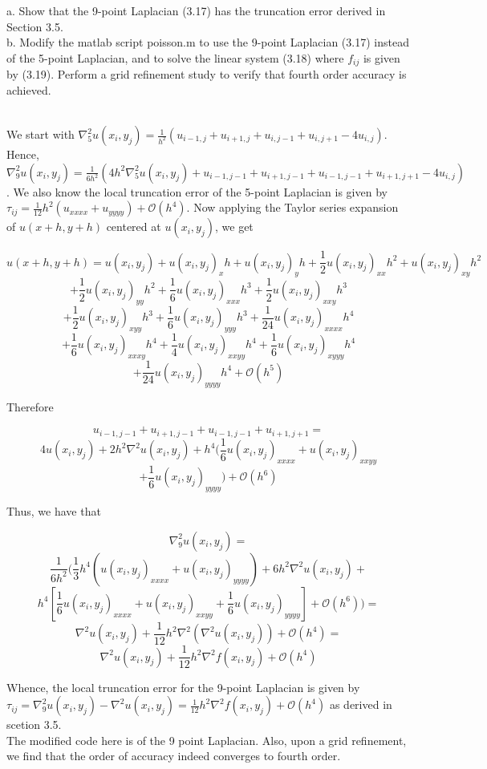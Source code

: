 a. Show that the 9-point Laplacian (3.17) has the truncation error derived in Section 3.5.\\
b. Modify the matlab script poisson.m to use the 9-point Laplacian (3.17) instead of the 5-point
Laplacian, and to solve the linear system (3.18) where $f_{ij}$ is given by (3.19). Perform a grid
refinement study to verify that fourth order accuracy is achieved.\\

\begin{solution}\renewcommand{\qedsymbol}{}\ \\
    We start with
    $\nabla_5^2u(x_i,y_j)=\frac{1}{h^2}(u_{i-1,j}+u_{i+1,j}+u_{i,j-1}+u_{i,j+1}-4u_{i,j})$.
    Hence, $\nabla_9^2u(x_i,y_j)=
    \frac{1}{6h^2}(4h^2\nabla_5^2u(x_i,y_j)+u_{i-1,j-1}+u_{i+1,j-1}+u_{i-1,j-1}+u_{i+1,j+1}-4u_{i,j})$.
    We also know the local truncation error of the 5-point Laplacian is given by
    $\tau_{ij}=\frac{1}{12}h^2(u_{xxxx}+u_{yyyy})+\mathcal{O}(h^4)$. Now applying the Taylor series
    expansion of $u(x+h,y+h)$ centered at $u(x_i,y_j)$, we get

    $$u(x+h,y+h)=u(x_i,y_j)+u(x_i,y_j)_xh+u(x_i,y_j)_yh+\frac12u(x_i,y_j)_{xx}h^2+u(x_i,y_j)_{xy}h^2$$
    $$+\frac12u(x_i,y_j)_{yy}h^2+\frac16u(x_i,y_j)_{xxx}h^3+\frac12u(x_i,y_j)_{xxy}h^3$$
    $$+\frac12u(x_i,y_j)_{xyy}h^3+\frac16u(x_i,y_j)_{yyy}h^3+\frac{1}{24}u(x_i,y_j)_{xxxx}h^4$$
    $$+\frac16u(x_i,y_j)_{xxxy}h^4+\frac14u(x_i,y_j)_{xxyy}h^4+\frac16u(x_i,y_j)_{xyyy}h^4$$
    $$+\frac{1}{24}u(x_i,y_j)_{yyyy}h^4+\mathcal{O}(h^5)$$

    Therefore
    
    $$u_{i-1,j-1}+u_{i+1,j-1}+u_{i-1,j-1}+u_{i+1,j+1}=$$
    $$4u(x_i,y_j)+2h^2\nabla^2u(x_i,y_j)+h^4(\frac16u(x_i,y_j)_{xxxx}+u(x_i,y_j)_{xxyy}$$
    $$+\frac16u(x_i,y_j)_{yyyy})+\mathcal{O}(h^6)$$

    Thus, we have that
    
    $$\nabla_9^2u(x_i,y_j)=$$
    $$\frac{1}{6h^2}(\frac{1}{3}h^4 (u(x_i,y_j)_{xxxx} + u(x_i,y_j)_{yyyy})+6 h^2 \nabla^2u(x_i,y_j)+$$
    $$h^4[\frac{1}{6}u(x_i,y_j)_{xxxx}+u(x_i,y_j)_{xxyy}+\frac16u(x_i,y_j)_{yyyy}]+\mathcal{O}(h^6))=$$
    $$\nabla^2u(x_i,y_j)+\frac{1}{12}h^2\nabla^2(\nabla^2u(x_i,y_j))+\mathcal{O}(h^4)=$$
    $$\nabla^2u(x_i,y_j)+\frac{1}{12}h^2\nabla^2f(x_i,y_j)+\mathcal{O}(h^4)$$

    Whence, the local truncation error for the 9-point Laplacian is given by
    $\tau_{ij}=\nabla_9^2u(x_i,y_j)-\nabla^2u(x_i,y_j)=\frac{1}{12}h^2\nabla^2f(x_i,y_j)
    +\mathcal{O}(h^4)$ as derived in scetion 3.5.\\

    The modified code here is of the 9 point Laplacian. Also, upon a grid refinement, we find that the
    order of accuracy indeed converges to fourth order.

\end{solution}

\newpage
